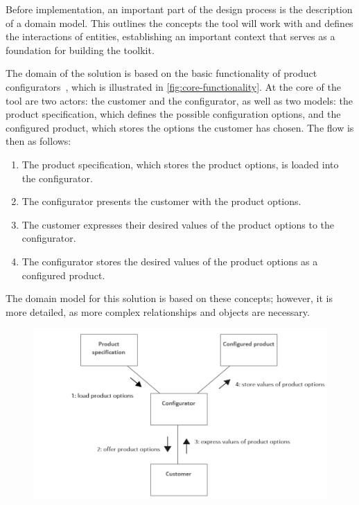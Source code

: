 Before implementation, an important part of the design process is the description of a domain model. This outlines the concepts the tool will work with and defines the interactions of entities, establishing an important context that serves as a foundation for building the toolkit. 

The domain of the solution is based on the basic functionality of product configurators~\cite{Hansen2003}, which is illustrated in \autoref{fig:core-functionality}. At the core of the tool are two actors: the customer and the configurator, as well as two models: the product specification, which defines the possible configuration options, and the configured product, which stores the options the customer has chosen. The flow is then as follows:
\begin{enumerate}
    \item The product specification, which stores the product options, is loaded into the configurator.
    \item The configurator presents the customer with the product options.
    \item The customer expresses their desired values of the product options to the configurator.
    \item The configurator stores the desired values of the product options as a configured product.
\end{enumerate}
The domain model for this solution is based on these concepts; however, it is more detailed, as more complex relationships and objects are necessary.

\begin{figure}[h]
\centering
\includegraphics[width=\textwidth]{images/diagram_communication.png}
\label{fig:core-functionality}
\end{figure}


